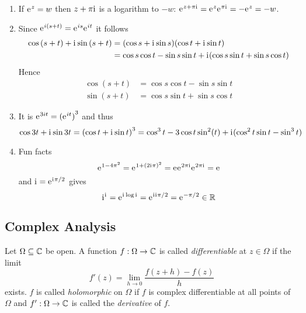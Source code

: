 \begin{exercise}\hfill
	\begin{enumerate}
		\item If \( \mathrm{e}\mkern1mu^z = w \) then \( z + \pi\mathrm{i}\mkern1mu \) is a logarithm to \( -w \):
		      \( \mathrm{e}\mkern1mu^{z + \pi\mathrm{i}\mkern1mu} = \mathrm{e}\mkern1mu^{z}\mathrm{e}\mkern1mu^{\pi\mathrm{i}\mkern1mu} = - \mathrm{e}\mkern1mu^{z} = -w \).
		\item Since \( \mathrm{e}\mkern1mu^{i(s + t)} = \mathrm{e}\mkern1mu^{is} \mathrm{e}\mkern1mu^{it} \) it follows
		      \[
			      \begin{split}
				      \cos{(s + t)} + \mathrm{i}\mkern1mu \sin{(s + t)}
				      & = (\cos{s} + \mathrm{i}\mkern1mu\sin{s})(\cos{t} + \mathrm{i}\mkern1mu\sin{t}) \\
				      & = \cos{s}\cos{t} - \sin{s}\sin{t} + \mathrm{i}\mkern1mu(\cos{s}\sin{t} + \sin{s}\cos{t})
			      \end{split}
		      \]
		      Hence
		      \[
			      \begin{split}
				      \cos{(s + t)} & = \cos{s}\cos{t} - \sin{s}\sin{t} \\
				      \sin{(s + t)} & = \cos{s}\sin{t} + \sin{s}\cos{t}
			      \end{split}
		      \]
		\item It is \( \mathrm{e}\mkern1mu^{3it} = {(\mathrm{e}\mkern1mu^{it})}^3 \) and thus
		      \[
			      \cos{3t} + \mathrm{i}\mkern1mu \sin{3t}
			      = {(\cos{t} + \mathrm{i}\mkern1mu\sin{t})}^3
			      = \cos^3{t} - 3\cos{t}\sin^2(t) + \mathrm{i}\mkern1mu(\cos^2{t}\sin{t} -\sin^3{t})
		      \]
		\item Fun facts
		      \[
			      \mathrm{e}\mkern1mu^{1 - 4\pi^2} = \mathrm{e}\mkern1mu^{1 + {(2\mathrm{i}\mkern1mu\pi)}^2} = \mathrm{e}\mkern1mu \mathrm{e}\mkern1mu^{2\pi\mathrm{i}\mkern1mu}\mathrm{e}\mkern1mu^{2\pi\mathrm{i}\mkern1mu} = \mathrm{e}\mkern1mu
		      \]
		      and \( \mathrm{i}\mkern1mu = \mathrm{e}\mkern1mu^{\mathrm{i}\mkern1mu\pi/2} \) gives
		      \[
			      \mathrm{i}\mkern1mu^\mathrm{i}\mkern1mu = \mathrm{e}\mkern1mu^{\mathrm{i}\mkern1mu\log\mathrm{i}\mkern1mu} = \mathrm{e}\mkern1mu^{\mathrm{i}\mkern1mu\mathrm{i}\mkern1mu\pi/2} = \mathrm{e}\mkern1mu^{-\pi/2} \in \mathbb{R}
		      \]
	\end{enumerate}
\end{exercise}
\bigskip


\subsection{Complex Analysis}
\bigskip

\begin{definition}\label{def:holomorphic_fnc}
	Let \( \Omega \subseteq \mathbb{C} \) be open. A function \( f : \Omega \to \mathbb{C} \) is called \emph{differentiable} at
	\( z \in \Omega \) if the limit
	\[
		f'(z) = \lim_{h \to 0} \frac{f(z + h) - f(z)}{h}
	\]
	exists. \( f \) is called \emph{holomorphic} on \( \Omega \) if \( f \) is complex differentiable
	at all points of \( \Omega \) and \( f': \Omega \to \mathbb{C} \) is called the \emph{derivative} of \( f \).
\end{definition}
\bigskip

